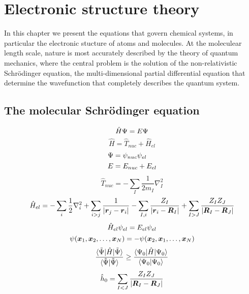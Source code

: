 \chapter{Electronic structure theory}
In this chapter we present the equations that govern chemical systems, in particular
the electronic stucture of atoms and molecules. At the moleculear length scale, nature
is most accurately described by the theory of quantum mechanics, where the central
problem is the solution of the non-relativistic Schr\"{o}dinger equation, the 
multi-dimensional partial differential equation that determine the wavefunction 
\Wavefunction that completely describes the quantum system.

\section{The molecular Schr\"{o}dinger equation}\label{sec:schrodinger}
\begin{equation}
    \hat{H}\Psi = E\Psi
\end{equation}
\begin{equation}
    \hat{H} = \hat{T}_{nuc} + \hat{H}_{el}
\end{equation}
\begin{align}
    \Psi &= \psi_{nuc}\psi_{el}\\
    E &= E_{nuc} + E_{el}
\end{align}
\begin{equation}
    \hat{T}_{nuc} = -\sum_I\frac{1}{2m_I} \nabla_I^2
\end{equation}
\begin{equation}
    \hat{H}_{el} = -\sum_i \frac{1}{2}\nabla_i^2 
	+ \sum_{i>j} \frac{1}{|\boldsymbol r_j-\boldsymbol r_i|}
	- \sum_{I,i} \frac{Z_I}{|\boldsymbol r_i-\boldsymbol R_I|}
        + \sum_{I>J} \frac{Z_IZ_J}{|\boldsymbol R_I-\boldsymbol R_J|}
\end{equation}
\begin{equation}
    \hat{H}_{el}\psi_{el} = E_{el}\psi_{el}
\end{equation}
\begin{equation}
    \psi(\boldsymbol x_1,\boldsymbol x_2,\dots,\boldsymbol x_N) = -
    \psi(\boldsymbol x_2,\boldsymbol x_1,\dots,\boldsymbol x_N)
\end{equation}
\begin{equation}
    \label{eq:var_princ}
    \frac{\langle\tilde{\Psi}|\hat{H}|\tilde{\Psi}\rangle}
    {\langle\tilde{\Psi}|\tilde{\Psi}\rangle}
    \geq
    \frac{\langle\Psi_0|\hat{H}|\Psi_0\rangle}
    {\langle\Psi_0|\Psi_0\rangle}
\end{equation}
\begin{equation}
    \hat{h}_0 = \sum_{I<J} \frac{Z_IZ_J}{|\boldsymbol R_I-\boldsymbol R_J|}
\end{equation}

